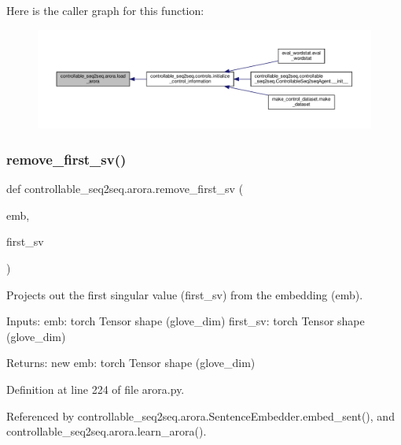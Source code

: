 Here is the caller graph for this function\+:
\nopagebreak
\begin{figure}[H]
\begin{center}
\leavevmode
\includegraphics[width=350pt]{namespacecontrollable__seq2seq_1_1arora_a576d45e4f9888847ff61af471423f47d_icgraph}
\end{center}
\end{figure}
\mbox{\label{namespacecontrollable__seq2seq_1_1arora_a8bbb1ed9f1b86ebe8378d07931f3040d}} 
\subsubsection{\texorpdfstring{remove\+\_\+first\+\_\+sv()}{remove\_first\_sv()}}
{\footnotesize\ttfamily def controllable\+\_\+seq2seq.\+arora.\+remove\+\_\+first\+\_\+sv (\begin{DoxyParamCaption}\item[{}]{emb,  }\item[{}]{first\+\_\+sv }\end{DoxyParamCaption})}

\begin{DoxyVerb}Projects out the first singular value (first_sv) from the embedding (emb).

Inputs:
  emb: torch Tensor shape (glove_dim)
  first_sv: torch Tensor shape (glove_dim)

Returns:
  new emb: torch Tensor shape (glove_dim)
\end{DoxyVerb}
 

Definition at line 224 of file arora.\+py.



Referenced by controllable\+\_\+seq2seq.\+arora.\+Sentence\+Embedder.\+embed\+\_\+sent(), and controllable\+\_\+seq2seq.\+arora.\+learn\+\_\+arora().

